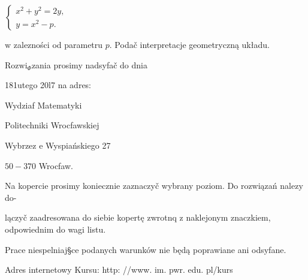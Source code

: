 \documentclass[a4paper,12pt]{article}
\begin{document}
$\left\{\begin{array}{l}
x^{2}+y^{2}=2y,\\
y=x^{2}-p.
\end{array}\right.$

$\mathrm{w}$ zalezności od parametru $p$. Podač interpretacje geometryczną układu.

$\mathrm{R}\mathrm{o}\mathrm{z}\mathrm{w}\mathrm{i}_{\Phi}$zania prosimy nadsyfač do dnia

181utego 20l7 na adres:

Wydziaf Matematyki

Politechniki Wrocfawskiej

Wybrzez $\mathrm{e}$ Wyspiańskiego 27

$50-370$ Wrocfaw.

Na kopercie prosimy koniecznie zaznaczyč wybrany poziom. Do rozwiązań nalez$\mathrm{y}$ do-

lączyč zaadresowana do siebie kopertę zwrotnq $\mathrm{z}$ naklejonym znaczkiem, odpowiednim do wagi listu.

Prace niespelniaj\S ce podanych warunków nie będą poprawiane ani odsyfane.

Adres internetowy Kursu: http: //www. im. pwr. edu. pl/kurs
\end{document}
